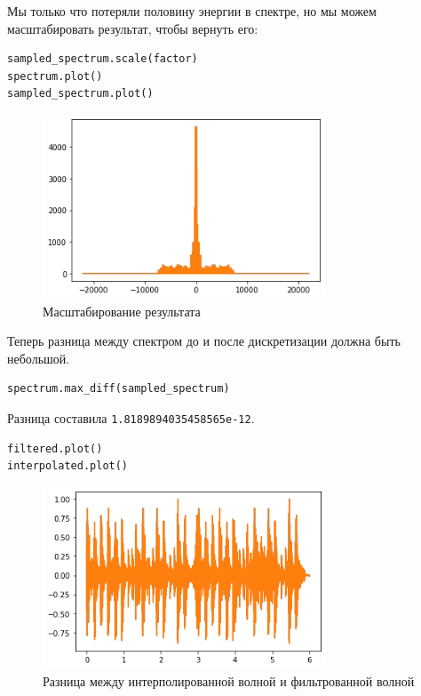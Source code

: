 \documentclass[a4paper,12pt]{report}
\begin{document}
Мы только что потеряли половину энергии в спектре, но мы можем масштабировать результат, чтобы вернуть его:

\begin{lstlisting}[caption=Масштабирование результата]
sampled_spectrum.scale(factor)
spectrum.plot()
sampled_spectrum.plot()
\end{lstlisting}

\begin{figure}[H]
        \centering
        \includegraphics[width=0.75\textwidth]{6.png}
        \caption{Масштабирование результата}
        \label{6}
\end{figure}

Теперь разница между спектром до и после дискретизации должна быть небольшой.

\begin{lstlisting}[caption=Разница между спектром до и после дискретизации]
spectrum.max_diff(sampled_spectrum)
\end{lstlisting}

Разница составила \texttt{1.8189894035458565e-12}.

\begin{lstlisting}[caption=Разница между интерполированной волной и фильтрованной волной]
filtered.plot()
interpolated.plot()
\end{lstlisting}

\begin{figure}[H]
        \centering
        \includegraphics[width=0.75\textwidth]{7.png}
        \caption{Разница между интерполированной волной и фильтрованной волной}
        \label{7}
\end{figure}
\end{document}
